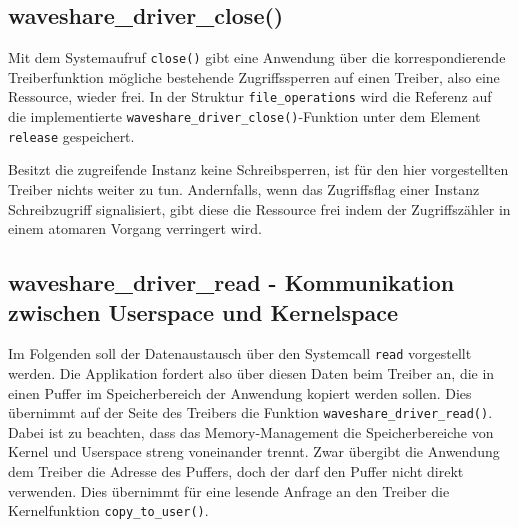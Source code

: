 \subsection{waveshare\_driver\_close()}
Mit dem Systemaufruf \texttt{close()} gibt eine Anwendung über die korrespondierende Treiberfunktion mögliche bestehende Zugriffssperren auf einen Treiber, also eine Ressource, wieder frei. In der Struktur \texttt{file\_operations} wird die Referenz auf die implementierte \texttt{waveshare_driver_close()}-Funktion unter dem Element \texttt{release} gespeichert. 

Besitzt die zugreifende Instanz keine Schreibsperren, ist für den hier vorgestellten Treiber nichts weiter zu tun. Andernfalls, wenn das Zugriffsflag einer Instanz Schreibzugriff signalisiert, gibt diese die Ressource frei indem der Zugriffszähler in einem atomaren Vorgang verringert wird. 




\subsection{waveshare\_driver\_read - Kommunikation zwischen Userspace und Kernelspace} %
Im Folgenden soll der Datenaustausch über den Systemcall \texttt{read} vorgestellt werden. Die Applikation fordert also über diesen Daten beim Treiber an, die in einen Puffer im Speicherbereich der Anwendung kopiert werden sollen. Dies übernimmt auf der Seite des Treibers die Funktion \texttt{waveshare_driver_read()}. Dabei ist zu beachten, dass das Memory-Management die Speicherbereiche von Kernel und Userspace streng voneinander trennt. Zwar übergibt die Anwendung dem Treiber die Adresse des Puffers, doch der darf den Puffer nicht direkt verwenden. Dies übernimmt für eine lesende Anfrage an den Treiber die Kernelfunktion \texttt{copy_to_user()}. 

